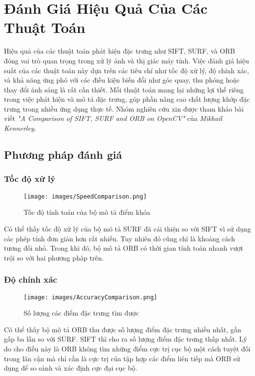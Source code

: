 \newpage
\section{Đánh Giá Hiệu Quả Của Các Thuật Toán}

Hiệu quả của các thuật toán phát hiện đặc trưng như SIFT, SURF, và ORB đóng vai trò quan trọng trong xử lý ảnh và thị giác máy tính. Việc đánh giá hiệu suất của các thuật toán này dựa trên các tiêu chí như tốc độ xử lý, độ chính xác, và khả năng ứng phó với các điều kiện biến đổi như góc quay, thu phóng hoặc thay đổi ánh sáng là rất cần thiết. Mỗi thuật toán mang lại những lợi thế riêng trong việc phát hiện và mô tả đặc trưng, góp phần nâng cao chất lượng khớp đặc trưng trong nhiều ứng dụng thực tế. Nhóm nghiên cứu xin được tham khảo bài viết \textit{"A Comparison of SIFT, SURF and ORB on OpenCV"} của \textit{Mikhail Kennerley}\cite{eval-feature}.
\subsection{Phương pháp đánh giá}
\subsubsection{Tốc độ xử lý}
\begin{figure}[H]
	\centering
	\texttt{[image: images/SpeedComparison.png]}
	\caption{Tốc độ tính toán của bộ mô tả điểm khóa}
\end{figure}
Có thể thấy tốc độ xử lý của bộ mô tả SURF đã cải thiện so với SIFT vì sử dụng các phép tính đơn giản hơn rất nhiều. Tuy nhiên đó cũng chỉ là khoảng cách tương đối nhỏ. Trong khi đó, bộ mô tả ORB có thời gian tính toán nhanh vượt trội so với hai phương pháp trên.
\subsubsection{Độ chính xác}
\begin{figure}[H]
	\centering
	\texttt{[image: images/AccuracyComparison.png]}
	\caption{Số lượng các điểm đặc trưng tìm được}
\end{figure}
Có thể thấy bộ mô tả ORB thu được số lượng điểm đặc trưng nhiều nhất, gần gấp ba lần so với SURF. SIFT thì cho ra số lượng điểm đặc trưng thấp nhất. Lý do cho điều này là ORB không tìm những điểm cực trị cục bộ một cách tuyệt đối trong lân cận mà chỉ cần là cực trị của tập hợp các điểm liên tiếp mà ORB sử dụng để so sánh và xác định cực đại cục bộ.
